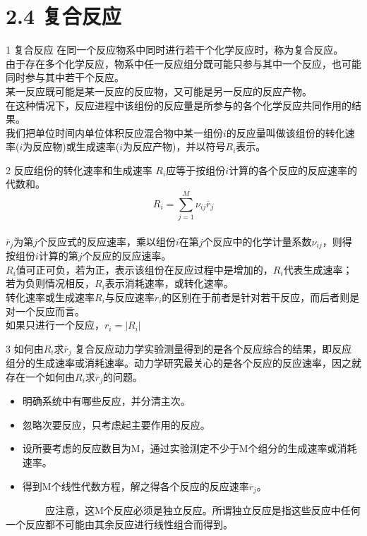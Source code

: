 \section{2.4 复合反应}
\begin{frame}{1 复合反应}
	在同一个反应物系中同时进行若干个化学反应时，称为复合反应。
	\\由于存在多个化学反应，物系中任一反应组分既可能只参与其中一个反应，也可能同时参与其中若干个反应。
	\\某一反应既可能是某一反应的反应物，又可能是另一反应的反应产物。
	\\在这种情况下，反应进程中该组份的反应量是所参与的各个化学反应共同作用的结果。
	\\我们把单位时间内单位体积反应混合物中某一组份$i$的反应量叫做该组份的转化速率($i$为反应物)或生成速率($i$为反应产物)，并以符号$R_i$表示。
\end{frame}

\begin{frame}{2 反应组份的转化速率和生成速率}
	$R_i$应等于按组份$i$计算的各个反应的反应速率的代数和。
	$$R_i=\sum_{j=1}^{M} \nu_{ij}\overline{r}_j$$
	\\$\overline{r}_j$为第$j$个反应式的反应速率，乘以组份$i$在第$j$个反应中的化学计量系数$\nu_{ij}$，则得按组份$i$计算的第$j$个反应的反应速率。
	\\$R_i$值可正可负，若为正，表示该组份在反应过程中是增加的，$R_i$代表生成速率；若为负则情况相反，$R_i$表示消耗速率，或转化速率。
	\\转化速率或生成速率$R_i$与反应速率$r_i$的区别在于前者是针对若干反应，而后者则是对一个反应而言。
	\\如果只进行一个反应，$r_i=|R_i|$
\end{frame}

\begin{frame}{3 如何由$R_i$求$\overline{r}_j$}
	复合反应动力学实验测量得到的是各个反应综合的结果，即反应组分的生成速率或消耗速率。动力学研究最关心的是各个反应的反应速率，因之就存在一个如何由$R_i$求$\overline{r}_j$的问题。
	\begin{itemize}
		\item[\bullet ] 明确系统中有哪些反应，并分清主次。
		\item[\bullet ] 忽略次要反应，只考虑起主要作用的反应。
		\item[\bullet ] 设所要考虑的反应数目为M，通过实验测定不少于M个组分的生成速率或消耗速率。
		\item[\bullet ] 得到M个线性代数方程，解之得各个反应的反应速率$\overline{r}_j$。
	\end{itemize}
	~~~~~~~~应注意，这M个反应必须是独立反应。所谓独立反应是指这些反应中任何一个反应都不可能由其余反应进行线性组合而得到。
\end{frame}


